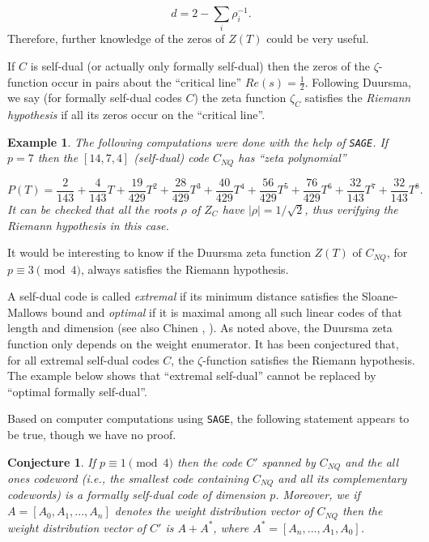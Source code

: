 \documentclass[submission%
]{dmtcs}
\newtheorem{example}{Example}
\newtheorem{conjecture}{Conjecture}
\def\sage{{\tt{SAGE}}}
\begin{document}
\[
d= 2-\sum_{i} \rho_i^{-1}. 
\]
Therefore, further 
knowledge of the zeros of $Z(T)$ could be very useful.

If $C$ is self-dual (or actually only formally self-dual)
then the zeros of the $\zeta$-function occur in 
pairs about the ``critical line'' $Re(s)=\frac{1}{2}$.
Following Duursma, we say (for formally self-dual codes
$C$) the zeta function $\zeta_C$ satisfies the
{\it Riemann hypothesis} if all its zeros 
occur on the ``critical line''. 


\begin{example}
The following computations were done with the help of {\tt SAGE}.
If $p=7$ then 
the $[14,7,4]$ (self-dual) code $C_{NQ}$ has ``zeta polynomial''

\[
P(T)= \frac{2}{143} + \frac{4}{143}T + \frac{19}{429}T^2 + 
\frac{28}{429}T^3 + \frac{40}{429}T^4 + \frac{56}{429}T^5 + 
\frac{76}{429}T^6 + \frac{32}{143}T^7 + \frac{32}{143}T^8.
\]
It can be checked that all the roots $\rho$ of $Z_C$
have $|\rho|=1/\sqrt{2}$, thus verifying the Riemann hypothesis in this case.
\end{example}

It would be interesting to know if the Duursma zeta function 
$Z(T)$ of $C_{NQ}$, for $p\equiv 3 \pmod 4$, always satisfies the 
Riemann hypothesis.

A self-dual code is called
{\it extremal} if its minimum distance satisfies the Sloane-Mallows bound
\cite{D3} and {\it optimal} if it is maximal among all such
linear codes of that length and dimension (see also Chinen 
\cite{Ch}, \cite{Ch2}). 
As noted above, the Duursma zeta function only depends on the weight
enumerator. It has been conjectured that, for all extremal self-dual codes $C$, 
the $\zeta$-function satisfies the Riemann hypothesis.
The example below shows that
``extremal self-dual'' cannot be replaced by ``optimal formally self-dual''.

Based on computer computations using \sage, the following 
statement appears to be true, though we have no proof.

\begin{conjecture}
If $p\equiv 1 \pmod 4$ then the code
$C'$ spanned by $C_{NQ}$ and the all ones codeword
(i.e., the smallest code containing $C_{NQ}$ and all its
complementary codewords) is a formally self-dual code
of dimension $p$. Moreover, we if $A=[A_0,A_1,...,A_n]$ denotes
the weight distribution vector of $C_{NQ}$ then
the weight distribution vector of 
$C'$ is $A+A^*$, where $A^*=[A_n,...,A_1,A_0]$. 
\end{conjecture}
\end{document}
